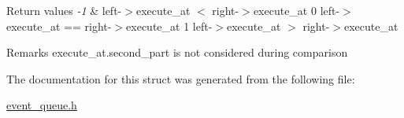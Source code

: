 \begin{DoxyRetVals}{Return values}
{\em -\/1} & left-\/$>$execute\+\_\+at $<$ right-\/$>$execute\+\_\+at 0 left-\/$>$execute\+\_\+at == right-\/$>$execute\+\_\+at 1 left-\/$>$execute\+\_\+at $>$ right-\/$>$execute\+\_\+at\\
\hline
\end{DoxyRetVals}
\begin{DoxyRemark}{Remarks}
execute\+\_\+at.\+second\+\_\+part is not considered during comparison 
\end{DoxyRemark}


The documentation for this struct was generated from the following file\+:\begin{DoxyCompactItemize}
\item 
\mbox{\hyperlink{event__queue_8h}{event\+\_\+queue.\+h}}\end{DoxyCompactItemize}
